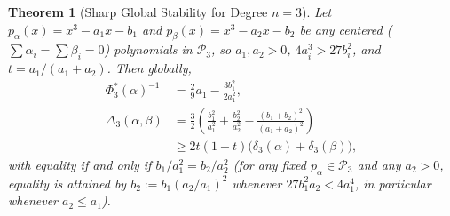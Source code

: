 \documentclass[11pt,a4paper]{article}
\newtheorem{theorem}{Theorem}[section]
\theoremstyle{definition}
\begin{document}
\begin{theorem}[Sharp Global Stability for Degree $n = 3$]
\label{thm:global-cubic}
Let $p_\alpha(x) = x^3 - a_1 x - b_1$ and $p_\beta(x) = x^3 - a_2 x - b_2$ be any centered ($\sum \alpha_i = \sum \beta_i = 0$) polynomials in $\mathcal{P}_3$, so $a_1, a_2 > 0$, $4a_i^3 > 27b_i^2$, and $t = a_1/(a_1+a_2)$. Then globally,
\begin{equation}
\label{eq:global-cubic}
\begin{aligned}
\Phi_3^*(\alpha)^{-1} &= \frac{2}{9} a_1 - \frac{3 b_1^2}{2 a_1^2}, \\
\Delta_3(\alpha, \beta) &= \frac{3}{2}\!\left(\frac{b_1^2}{a_1^2} + \frac{b_2^2}{a_2^2} - \frac{(b_1 + b_2)^2}{(a_1 + a_2)^2}\right) \\
&\ge 2t(1-t)\big(\delta_3(\alpha) + \delta_3(\beta)\big),
\end{aligned}
\end{equation}
with equality if and only if $b_1/a_1^2 = b_2/a_2^2$ (for any fixed $p_\alpha \in \mathcal{P}_3$ and any $a_2 > 0$, equality is attained by $b_2 := b_1(a_2/a_1)^2$ whenever $27 b_1^2 a_2 < 4 a_1^4$, in particular whenever $a_2 \le a_1$).
\end{theorem}
\end{document}
